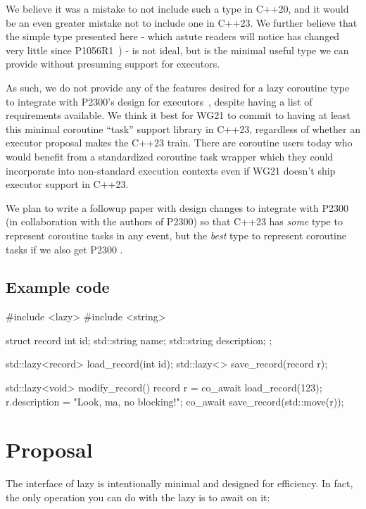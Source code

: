 We believe it was a mistake to not include such a type in C++20,
and it would be an even greater mistake not to include one in C++23.
We further believe that the simple type presented here
- which astute readers will notice
has changed very little since P1056R1~\cite{P1056R1}) -
is not ideal, but is the minimal useful type we can provide
without presuming support for executors.

As such, we do not provide any of the features
desired for a lazy coroutine type to integrate with
P2300's design for executors~\cite{P2300R3},
despite having a list of requirements available.
We think it best for WG21 to commit to having at least this minimal
coroutine ``task'' support library in C++23,
regardless of whether an executor proposal makes the C++23 train.
There are coroutine users today who would benefit
from a standardized coroutine task wrapper
which they could incorporate into non-standard execution contexts
even if WG21 doesn't ship executor support in C++23.

We plan to write a followup paper with design changes to integrate
 with P2300 (in collaboration with the authors of P2300)
so that C++23 has \emph{some} type to represent coroutine tasks in any event,
but the \emph{best} type to represent coroutine tasks if we also get
P2300 .

\subsection{Example code}

\begin{codeblock}
#include <lazy>
#include <string>

struct record {
  int id;
  std::string name;
  std::string description;
};

std::lazy<record> load_record(int id);
std::lazy<> save_record(record r);

std::lazy<void> modify_record() {
  record r = co_await load_record(123);
  r.description = "Look, ma, no blocking!";
  co_await save_record(std::move(r));
}
\end{codeblock}

\section{Proposal}

The interface of lazy is intentionally minimal and designed for efficiency.
In fact, the only operation you can do with the lazy is to await on it:

